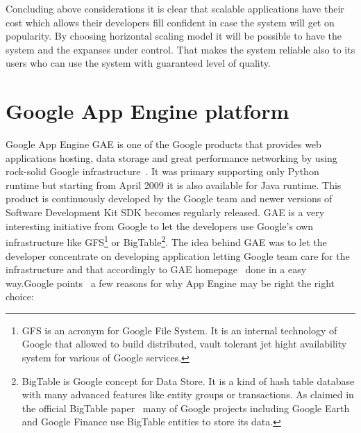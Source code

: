 Concluding above considerations it is clear that scalable applications have their cost which allows their developers fill confident in case the system will get on popularity. By choosing horizontal scaling model it will be possible to have the system and the expanses under control. That makes the system reliable also to its users who can use the system with guaranteed level of quality.         
 
\section{Google App Engine platform}\label{sec:gae_general}
Google App Engine GAE is one of the Google products that provides web applications hosting, data storage and great performance networking by using rock-solid Google infrastructure~\cite[page 1]{gae_develop}. It was primary supporting only Python runtime but starting from April 2009 it is also available for Java runtime. This product is continuously developed by the Google team and newer versions of Software Development Kit SDK becomes regularly released. GAE is a very interesting initiative from Google to let the developers use Google's own infrastructure like GFS\footnote{GFS is an acronym for Google File System. It is an internal technology of Google that allowed to build distributed, vault tolerant jet hight availability system for various of Google services.} or BigTable\footnote{BigTable is Google concept for Data Store. It is a kind of hash table database with many advanced features like entity groups or transactions. As claimed in the official BigTable paper~\cite{bigtable_about} many of Google projects including Google Earth and Google Finance use BigTable entities to store its data.}. The idea behind GAE was to let the developer concentrate on developing application letting Google team care for the infrastructure and that accordingly to GAE homepage~\cite{gae_homepage} done in a easy way.Google points~\cite{gae_why} a few reasons for why App Engine may be right the right choice: 
